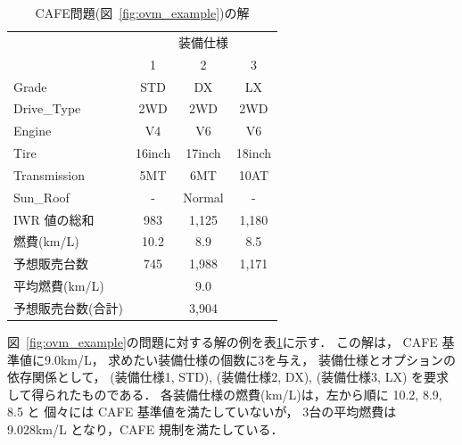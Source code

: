 \begin{table}[t]
  \centering
  \caption{CAFE問題(図~\ref{fig:ovm_example})の解}
  \begin{tabular}{l|c|c|c} \bhline
    \multicolumn{1}{c|}{装備}   & \multicolumn{3}{c}{装備仕様} \\ \cline{2-4}
                          & 1	& 2 	 & 3	\\  \hline
    \textsf{Grade}        & \textsf{STD}    & \textsf{DX}     & \textsf{LX}\\
    \textsf{Drive\_Type}  & \textsf{2WD}    & \textsf{2WD}    & \textsf{2WD}\\
    \textsf{Engine}	  & \textsf{V4}     & \textsf{V6}     & \textsf{V6}\\
    \textsf{Tire}	  & \textsf{16inch} & \textsf{17inch} & \textsf{18inch}\\
    \textsf{Transmission} & \textsf{5MT}    & \textsf{6MT}    & \textsf{10AT}\\
    \textsf{Sun\_Roof}    & -               & \textsf{Normal} & -  \\ \hline
    IWR 値の総和          & 983  & 1,125   & 1,180 \\ %
    燃費(km/L)      & 10.2  & 8.9     & 8.5 \\ %
    予想販売台数    & 745   & 1,988   & 1,171  \\ \hline
    平均燃費(km/L)  & \multicolumn{3}{c}{9.0} \\ 
    予想販売台数(合計)  & \multicolumn{3}{c}{3,904} \\ \hline
 \end{tabular}
 \label{tab:ovm_ans}
\end{table}

図~\ref{fig:ovm_example}の問題に対する解の例を表\ref{tab:ovm_ans}に示す．
この解は，
CAFE 基準値に9.0km/L，
求めたい装備仕様の個数に3を与え，
装備仕様とオプションの依存関係として，
(装備仕様1, \textsf{STD}),
(装備仕様2, \textsf{DX}),
(装備仕様3, \textsf{LX})
を要求して得られたものである．
各装備仕様の燃費(km/L)は，左から順に 10.2, 8.9, 8.5 と
個々には CAFE 基準値を満たしていないが，
3台の平均燃費は 9.028km/L となり，CAFE 規制を満たしている．


